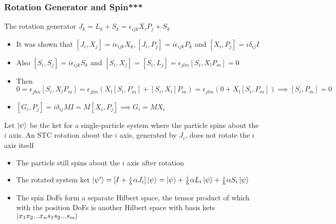 \documentclass[8pt,t,mathserif,aspectratio=169]{beamer}
\begin{document}
\begin{frame}
  \frametitle{Rotation Generator and Spin***}
  \vspace{1mm}
  The rotation generator $J_k = L_k + S_k = \epsilon_{ijk} X_i P_j + S_k$
  \begin{itemize}
    \item It was shown that $[J_i,X_j] = i \epsilon_{ijk} X_k,[J_i,P_j] = i \epsilon_{ijk} P_k$ and $[X_i,P_j] = i \delta_{ij} I$
    \item Also $[S_i,S_j] = i \epsilon_{ijk} S_k$ and $[S_i,X_j] = [S_i,L_j] = \epsilon_{jlm} [S_i,X_l P_m] = 0$
    \item Then $0 = \epsilon_{jlm} [S_i,X_l P_m] = \epsilon_{jlm} (X_l [S_i,P_m] + [S_i,X_l] P_m) = \epsilon_{jlm} (0 + X_l [S_i,P_m]) \implies [S_i,P_m] = 0$
    \item $[G_i,P_j] = i \delta_{ij} M I = M [X_i,P_j] \implies G_i = M X_i$
  \end{itemize}  
  Let $\ket{\psi}$ be the ket for a single-particle system where the particle spins about the $i$ axis. An STC rotation about the $i$ axis, generated by $J_i$, does not rotate the $i$ axis itself 
  \begin{itemize}
    \item The particle still spins about the $i$ axis after rotation
    \item The rotated system ket $\ket{\psi'} = [I + {i \over \hbar} \alpha J_i] \ket{\psi} = \ket{\psi} + {i \over \hbar} \alpha L_i \ket{\psi} + {i \over \hbar} \alpha S_i \ket{\psi}$
    \item The spin DoFs form a separate Hilbert space, the tensor product of which with the position DoFs is another Hilbert space with basis kets $\ket{x_1 x_2 ... x_n s_1 s_2 ... s_m}$
  \end{itemize}
\end{frame}
\end{document}
